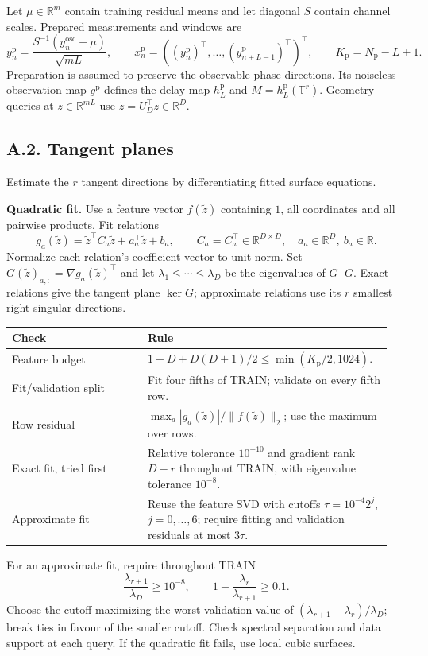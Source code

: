 \documentclass[11pt,a4paper]{article}
\newcommand{\R}{\mathbb R}
\newcommand{\T}{\mathbb T}
\begin{document}
Let $\mu\in\R^m$ contain training residual means and let diagonal $S$
contain channel scales. Prepared measurements and windows are
\[
y_n^{\mathrm p}=\frac{S^{-1}(y_n^{\mathrm{osc}}-\mu)}{\sqrt{mL}},
\qquad x_n^{\mathrm p}=((y_n^{\mathrm p})^\top,\ldots,
(y_{n+L-1}^{\mathrm p})^\top)^\top,
\qquad K_{\mathrm p}=N_{\mathrm p}-L+1.
\]
Preparation is assumed to preserve the observable phase directions.
Its noiseless observation map $g^{\mathrm p}$ defines the delay map
$h_L^{\mathrm p}$ and $M=h_L^{\mathrm p}(\T^r)$.
Geometry queries at $z\in\R^{mL}$ use $\widetilde z=U_D^\top z\in\R^D$.

\subsection*{A.2. Tangent planes}
\label{app:tangents}
Estimate the $r$ tangent directions by differentiating fitted surface equations.

\textbf{Quadratic fit.}
Use a feature vector $f(\widetilde z)$ containing $1$, all coordinates and
all pairwise products. Fit relations
\[
g_a(\widetilde z)=\widetilde z^\top C_a\widetilde z+
 a_a^\top\widetilde z+b_a,\qquad
C_a=C_a^\top\in\R^{D\times D},\quad a_a\in\R^D,\ b_a\in\R.
\]
Normalize each relation's coefficient vector to unit norm.
Set $G(\widetilde z)_{a,:}=\nabla g_a(\widetilde z)^\top$ and let
$\lambda_1\le\cdots\le\lambda_D$ be the eigenvalues of $G^\top G$.
Exact relations give the tangent plane $\ker G$; approximate relations
use its $r$ smallest right singular directions.
\begin{center}
\begin{tabular}{@{}p{0.34\linewidth}p{0.61\linewidth}@{}}
\toprule
Check & Rule\\
\midrule
Feature budget & $1+D+D(D+1)/2\le\min(K_{\mathrm p}/2,1024)$.\\
Fit/validation split & Fit four fifths of TRAIN; validate on every fifth row.\\
Row residual & $\max_a|g_a(\widetilde z)|/\|f(\widetilde z)\|_2$;
use the maximum over rows.\\
Exact fit, tried first & Relative tolerance $10^{-10}$ and gradient rank
$D-r$ throughout TRAIN, with eigenvalue tolerance $10^{-8}$.\\
Approximate fit & Reuse the feature SVD with cutoffs
$\tau=10^{-4}2^j$, $j=0,\ldots,6$; require fitting and validation
residuals at most $3\tau$.\\
\bottomrule
\end{tabular}
\end{center}
For an approximate fit, require throughout TRAIN
\[
\frac{\lambda_{r+1}}{\lambda_D}\ge10^{-8},\qquad
1-\frac{\lambda_r}{\lambda_{r+1}}\ge0.1.
\]
Choose the cutoff maximizing the worst validation value of
$(\lambda_{r+1}-\lambda_r)/\lambda_D$; break ties in favour of the smaller
cutoff. Check spectral separation and data support at each query.
If the quadratic fit fails, use local cubic surfaces.
\end{document}
